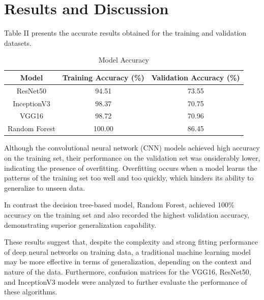 \documentclass[12pt]{article}
\begin{document}
\section*{Results and Discussion}
Table II presents the accurate results obtained for the training and validation datasets. 
\begin{table}[!h]
\renewcommand{\arraystretch}{1.3}
\caption{Model Accuracy}
\label{table:model_accuracy}
\centering
\begin{tabular}{|c|c|c|}
\hline
\textbf{Model} & \textbf{Training Accuracy (\%)} & \textbf{Validation Accuracy (\%)} \\
\hline
ResNet50 & 94.51 & 73.55 \\
\hline
InceptionV3 & 98.37 & 70.75 \\
\hline
VGG16 & 98.72 & 70.96 \\
\hline
Random Forest & 100.00 & 86.45 \\
\hline
\end{tabular}
\end{table}

Although the convolutional neural network (CNN) models achieved high accuracy on the training set, their performance on the validation set was onsiderably lower, indicating the presence of overfitting. Overfitting occurs when a model learns the patterns of the training set too well and too quickly, which hinders its ability to generalize to unseen data. 

In contrast the decision tree-based model, Random Forest, achieved 100\% accuracy on the training set and also recorded the highest validation accuracy, demonstrating superior generalization capability. 

These results suggest that, despite the complexity and strong fitting performance of deep neural networks on training data, a traditional machine learning model may be more effective in terms of generalization, depending on the context and nature of the data. 
Furthermore, confusion matrices for the VGG16, ResNet50, and InceptionV3 models were analyzed to further evaluate the performance of these algorithms.
\end{document}
